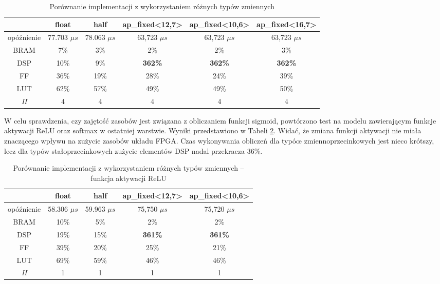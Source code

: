 \begin{table}[h] \centering
  \caption{Porównanie implementacji z wykorzystaniem różnych typów zmiennych}
  \centering
  \begin{tabular} {c|c|c|c|c|c} \hline \label{tab:fixed-vs-float}  
                  & float           & half            & ap\_fixed<12,7> & ap\_fixed<10,6> & ap\_fixed<16,7> \\ \hline
    opóźnienie    & 77.703 $\mu s$  & 78.063 $\mu s$  & 63,723 $\mu s$  & 63,723 $\mu s$  & 63,723 $\mu s$  \\
    BRAM          & 7\%             & 3\%             & 2\%             & 2\%             & 3\%             \\
    DSP           & 10\%            & 9\%             & \textbf{362\%}  & \textbf{362\%}  & \textbf{362\%}  \\
    FF            & 36\%            & 19\%            & 28\%            & 24\%            & 39\%            \\
    LUT           & 62\%            & 57\%            & 49\%            & 49\%            & 50\%            \\
    \emph{II}     & 4               & 4               & 4               & 4               &  4              \\
  \end{tabular}
\end{table}

W celu sprawdzenia, czy zajętość zasobów jest związana z obliczaniem funkcji sigmoid, powtórzono test na modelu zawierającym funkcje aktywacji ReLU oraz softmax w ostatniej warstwie. Wyniki przedstawiono w Tabeli \ref{tab:fixed-vs-float-relu}. Widać, że zmiana funkcji aktywacji nie miała znaczącego wpływu na zużycie zasobów układu FPGA. Czas wykonywania obliczeń dla typóœ zmiennoprzecinkowych jest nieco krótszy, lecz dla typów stałoprzecinkowych zużycie elementów DSP nadal przekracza 36\%.

\begin{table}[h] \centering
  \caption{Porównanie implementacji z wykorzystaniem różnych typów zmiennych -- funkcja aktywacji ReLU}
  \centering
  \begin{tabular} {c|c|c|c|c} \hline \label{tab:fixed-vs-float-relu}  
                  & float           & half            & ap\_fixed<12,7> & ap\_fixed<10,6> \\ \hline
    opóźnienie    & 58.306 $\mu s$  & 59.963 $\mu s$  & 75,750 $\mu s$  & 75,720 $\mu s$  \\
    BRAM          & 10\%             & 5\%             & 2\%             & 2\%            \\
    DSP           & 19\%            & 15\%             & \textbf{361\%}  & \textbf{361\%} \\
    FF            & 39\%            & 20\%            & 25\%            & 21\%            \\
    LUT           & 69\%            & 59\%            & 46\%            & 46\%            \\
    \emph{II}     & 1               & 1               & 1               & 1               \\
  \end{tabular}
\end{table}

